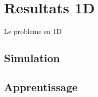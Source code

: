 
% 

\section{Resultats 1D}
Le probleme en 1D
\subsection{Simulation}

\subsection{Apprentissage}


% 
